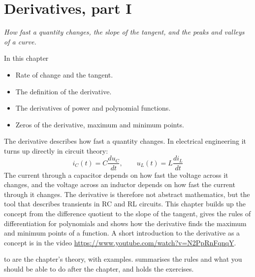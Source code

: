 
\chapter{Derivatives, part I}
\label{c12:ch}

{\large\itshape How fast a quantity changes, the slope of the tangent, and the peaks and valleys of
a curve.\par}

\begin{chapterbox}{In this chapter}
\begin{itemize}
  \item Rate of change and the tangent.
  \item The definition of the derivative.
  \item The derivatives of power and polynomial functions.
  \item Zeros of the derivative, maximum and minimum points.
\end{itemize}
\end{chapterbox}

The derivative describes how fast a quantity changes. In electrical engineering it turns up
directly in circuit theory:
\[
  i_C(t) = C\frac{du_C}{dt}, \qquad u_L(t) = L\frac{di_L}{dt}
\]
The current through a capacitor depends on how fast the voltage across it changes, and the voltage
across an inductor depends on how fast the current through it changes. The derivative is therefore
not abstract mathematics, but the tool that describes transients in RC and RL circuits. This
chapter builds up the concept from the difference quotient to the slope of the tangent, gives the
rules of differentiation for polynomials and shows how the derivative finds the maximum and minimum
points of a function. A short introduction to the derivative as a concept is in the video
\url{https://www.youtube.com/watch?v=N2PpRnFqnqY}.

 to  are the chapter's theory, with
examples.  summarises the rules and what you should be able to do
after the chapter, and  holds the exercises.




